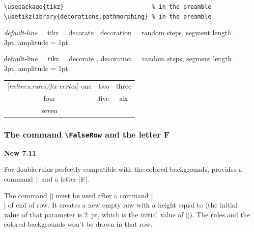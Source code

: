 \documentclass[dvipsnames]{article}
\begin{document}
\bigskip
\begin{Verbatim}[formatcom = \footnotesize \color{gray}]
\usepackage{tikz}                         % in the preamble
\usetikzlibrary{decorations.pathmorphing} % in the preamble
\end{Verbatim}


\begin{footnotesize}
\begin{Code}
\NiceMatrixOptions
  {
    \emph{default-line} =
      {
        tikz =
          {
            decorate ,
            decoration = { random steps, segment length = 3pt, amplitude = 1pt }
          }
      }
  }
\end{Code}
\end{footnotesize}

\bigskip
\begin{scope}
\NiceMatrixOptions
  {
    default-line =
      {
        tikz =
          {
            decorate ,
            decoration = { random steps, segment length = 3pt, amplitude = 1pt }
          }
      }
  }

\renewcommand{\arraystretch}{1.3}%

\begin{Code}[width=11cm,show-output,no-cell-nodes]
\renewcommand{\arraystretch}{1.3}
\begin{NiceTabular}{ccc}[\emph{hvlines,rules/fix-vertex}]
  one   & two  & three \\
  four  & five & six \\
  seven &  \\
\end{NiceTabular}
\end{Code}
 
\end{scope}

\subsubsection{The command \texttt{\textbackslash FalseRow} and the letter F}

\label{FalseRow}

\colorbox{yellow!50}{\textbf{New 7.11}}

\nobreak
\smallskip
For double rules perfectly compatible with the colored backgrounds, 
provides a command |\FalseRow| and a letter |F|.

\smallskip
The command |\FalseRow| must be used after a command |\\| of end of row. It
creates a new empty row with a height equal to  (the
initial value of that parameter is 2~pt, which is the initial value of
|\doublerulesep|). The rules and the colored backgrounds won't be drawn in that
row.
\end{document}

